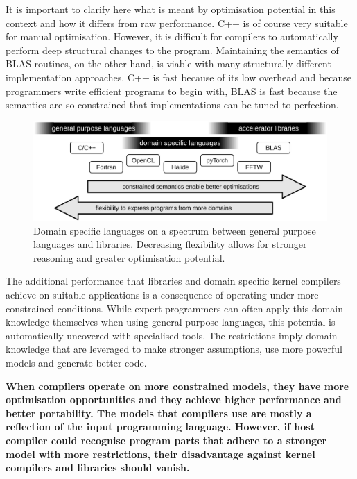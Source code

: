     It is important to clarify here what is meant by optimisation potential in
    this context and how it differs from raw performance.
    C++ is of course very suitable for manual optimisation.
    However, it is difficult for compilers to automatically perform deep
    structural changes to the program.
    Maintaining the semantics of BLAS routines, on the other hand, is viable
    with many structurally different implementation approaches.
    C++ is fast because of its low overhead and because programmers write
    efficient programs to begin with, BLAS is fast because the semantics are so
    constrained that implementations can be tuned to perfection.

\begin{figure}[t]
\centering
\includegraphics[width=\textwidth]{figures/DSLgradient}
\caption{Domain specific languages on a spectrum between general purpose
         languages and libraries.
         Decreasing flexibility allows for stronger reasoning and greater
         optimisation potential.}
\label{specialgradient}
\end{figure}

    The additional performance that libraries and domain specific kernel
    compilers achieve on suitable applications is a consequence of operating
    under more constrained conditions.
    While expert programmers can often apply this domain knowledge themselves
    when using general purpose languages, this potential is automatically
    uncovered with specialised tools.
    The restrictions imply domain knowledge that are leveraged to make stronger
    assumptions, use more powerful models and generate better code.

    {\bf
    When compilers operate on more constrained models, they have more
    optimisation opportunities and they achieve higher performance and better
    portability.
    The models that compilers use are mostly a reflection of the input
    programming language.
    However, if host compiler could recognise program parts that adhere
    to a stronger model with more restrictions, their disadvantage against
    kernel compilers and libraries should vanish.
    }

